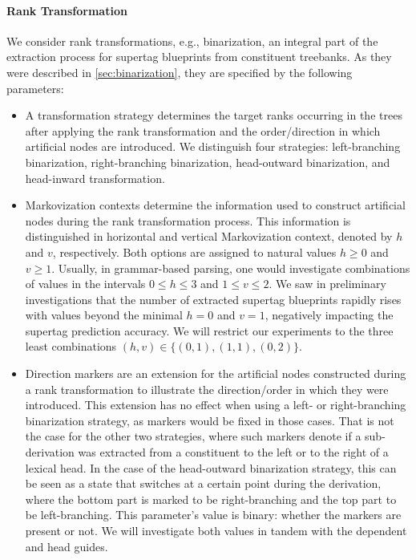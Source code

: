 \documentclass[../../document.tex]{subfiles}
\begin{document}
    \paragraph*{Rank Transformation}
    We consider rank transformations, e.g.\@, binarization, an integral part of the extraction process for supertag blueprints from constituent treebanks.
    As they were described in \cref{sec:binarization}, they are specified by the following parameters:
    \begin{itemize}
        \item A transformation strategy determines the target ranks occurring in the trees after applying the rank transformation and the order/direction in which artificial nodes are  introduced. We distinguish four strategies: left-branching binarization, right-branching binarization, head-outward binarization, and head-inward transformation.
        \item Markovization contexts determine the information used to construct artificial nodes during the rank transformation process. This information is distinguished in horizontal and vertical Markovization context, denoted by \(h\) and \(v\), respectively. Both options are assigned to natural values \(h \ge 0\) and \(v \ge 1\). Usually, in grammar-based parsing, one would investigate combinations of values in the intervals \(0 \le h \le 3\) and \(1 \le v \le 2\). We saw in preliminary investigations that the number of extracted supertag blueprints rapidly rises with values beyond the minimal \(h = 0\) and \(v = 1\), negatively impacting the supertag prediction accuracy. \citep{Rup22} We will restrict our experiments to the three least combinations \((h, v) \in \{(0,1), (1,1), (0,2)\}\).
        \item Direction markers are an extension for the artificial nodes constructed during a rank transformation to illustrate the direction/order in which they were introduced. This extension has no effect when using a left- or right-branching binarization strategy, as markers would be fixed in those cases. That is not the case for the other two strategies, where such markers denote if a sub-derivation was extracted from a constituent to the left or to the right of a lexical head. In the case of the head-outward binarization strategy, this can be seen as a state that switches at a certain point during the derivation, where the bottom part is marked to be right-branching and the top part to be left-branching. This parameter's value is binary: whether the markers are present or not. We will investigate both values in tandem with the dependent and head guides.

\end{itemize}
\end{document}
